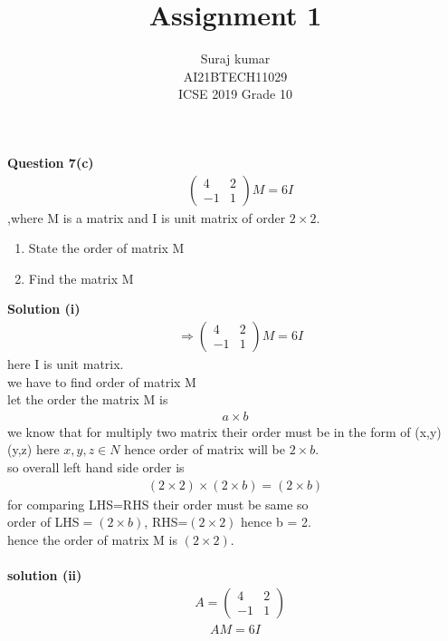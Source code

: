 \documentclass[journal,12pt,twocolumn]{IEEEtran}
\title{Assignment 1}
\author{Suraj kumar \\ \normalsize AI21BTECH11029\\\vspace*{20pt} \Large ICSE 2019 Grade 10}
\newcommand{\myvec}[1]{\ensuremath{\begin{pmatrix}#1\end{pmatrix}}}
\begin{document}
\maketitle

\textbf{Question 7(c)}\begin{align*} &\myvec{4 & 2 \\-1 & 1 }M=6I\end{align*}
 ,where M is a matrix and I is unit matrix of order $2\times 2.$
		\begin{enumerate}[label=(\roman*)]
		\item State the order of matrix M
		\item Find the matrix M
	\end{enumerate}	
	
 \textbf{Solution (i) } 
 \begin{align}
	 &\Rightarrow   \myvec{
     4 & 2 \\
     -1 & 1 
      }M=6I
 \end{align}
    here I is unit matrix.\\
    we have to find order of matrix M\\
    let the order the matrix M is 
    \begin{align}
    a\times b
\end{align}     
      we know that for multiply two matrix their order must be in the form of  (x,y) (y,z)  here $x,y,z \in N$
      hence order of matrix will be $2\times b$.\\
      so overall left hand side order is
      \begin{align}
      (2\times 2)\times(2\times b) =(2\times b)
\end{align}        
      for comparing LHS=RHS their order must be same so \\
      order of LHS$=(2\times b)$,
      RHS=$(2\times 2)$  hence b = 2.\\
      hence the order of matrix M is $(2\times 2).$\\\\
\textbf{solution (ii)}\\
  \begin{align}
 &A=\myvec{
      4 & 2\\
      -1 & 1
     }
\end{align}
 \begin{align}
 AM=6I
 \end{align}
 
\end{document}
